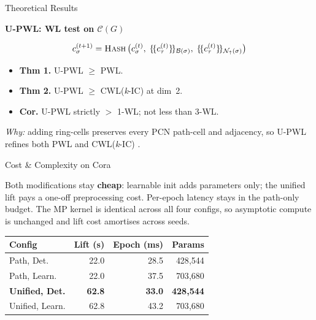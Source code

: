 \documentclass[final]{beamer}
\renewcommand\heading[1]{%
  \par\bigskip
  {\sffamily\bfseries\large #1}\par\smallskip
}
\newlength{\colwidth}
\begin{document}
\begin{frame}[t]
\begin{columns}[t]
\begin{column}{\colwidth}
\begin{exampleblock}{Theoretical Results}
        \heading{U-PWL: WL test on $\mathcal C(G)$}
        \[
          c_\sigma^{(t+1)}=\textsc{Hash}\,\bigl(
            c_\sigma^{(t)},\;
            \{\!\{c_\tau^{(t)}\}\!\}_{\mathcal B(\sigma)},\;
            \{\!\{c_\tau^{(t)}\}\!\}_{\mathcal N_\uparrow(\sigma)}
          \bigr)
        \]

        \medskip
      \begin{itemize}\setlength{\itemsep}{0.15em}
          \item \textbf{Thm 1.} U-PWL $\geq$ PWL.
          \item \textbf{Thm 2.} U-PWL $\geq$ CWL(\textit{k}-IC) at dim~2.
          \item \textbf{Cor.}   U-PWL strictly $>$ 1-WL; not less than 3-WL.
        \end{itemize}

        \medskip
        \emph{Why:} adding ring-cells preserves every PCN path-cell and
        adjacency, so U-PWL refines both PWL and CWL(\textit{k}-IC)
        \citep{bodnar_weisfeiler_2021,bodnar_weisfeiler_2022,truong_weisfeiler_2024}.

      \end{exampleblock}

      \medskip

      \begin{block}{Cost \& Complexity on Cora}

        Both modifications stay \textbf{cheap}: learnable init adds
        parameters only; the unified lift pays a one-off preprocessing
        cost. Per-epoch latency stays in the path-only budget. The MP
        kernel is identical across all four configs, so asymptotic
        compute is unchanged and lift cost amortises across seeds.

        \medskip
        \centering\small
        \renewcommand{\arraystretch}{1.15}
        \begin{tabular}{@{}l r r r@{}}
          \toprule
          \textbf{Config} & \textbf{Lift (s)} & \textbf{Epoch (ms)} & \textbf{Params} \\
          \midrule
          Path, Det.      & 22.0 & 28.5 & 428{,}544 \\
          Path, Learn.    & 22.0 & 37.5 & 703{,}680 \\
          \textbf{Unified, Det.}   & \textbf{62.8} & \textbf{33.0} & \textbf{428{,}544} \\
          Unified, Learn. & 62.8 & 43.2 & 703{,}680 \\
          \bottomrule
        \end{tabular}


\end{block}
\end{column}
\end{columns}
\end{frame}
\end{document}
